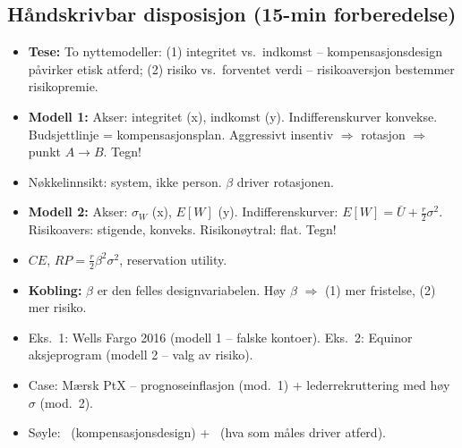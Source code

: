 \subsection*{Håndskrivbar disposisjon (15-min forberedelse)}
\begin{itemize}\setlength{\itemsep}{2pt}
\item \textbf{Tese:} To nyttemodeller: (1) integritet vs.\ indkomst -- kompensasjonsdesign påvirker etisk atferd; (2) risiko vs.\ forventet verdi -- risikoaversjon bestemmer risikopremie.
\item \textbf{Modell 1:} Akser: integritet (x), indkomst (y). Indifferenskurver konvekse. Budsjettlinje = kompensasjonsplan. Aggressivt insentiv $\Rightarrow$ rotasjon $\Rightarrow$ punkt $A\to B$. Tegn!
\item Nøkkelinnsikt: system, ikke person. $\beta$ driver rotasjonen.
\item \textbf{Modell 2:} Akser: $\sigma_W$ (x), $E[W]$ (y). Indifferenskurver: $E[W] = \bar{U} + \tfrac{r}{2}\sigma^2$. Risikoavers: stigende, konveks. Risikonøytral: flat. Tegn!
\item $CE$, $RP = \tfrac{r}{2}\beta^2\sigma^2$, reservation utility.
\item \textbf{Kobling:} $\beta$ er den felles designvariabelen. Høy $\beta$ $\Rightarrow$ (1) mer fristelse, (2) mer risiko.
\item Eks.\ 1: Wells Fargo 2016 (modell 1 -- falske kontoer). Eks.\ 2: Equinor aksjeprogram (modell 2 -- valg av risiko).
\item Case: Mærsk PtX -- prognoseinflasjon (mod.\ 1) + lederrekruttering med høy $\sigma$ (mod.\ 2).
\item Søyle: \SThree\ (kompensasjonsdesign) + \STwo\ (hva som måles driver atferd).
\end{itemize}

